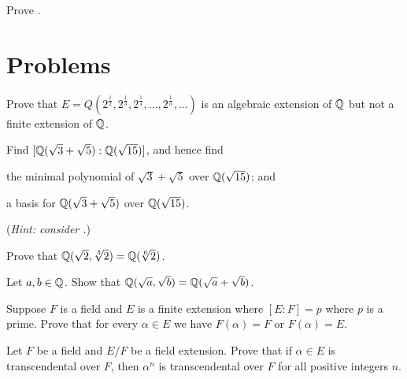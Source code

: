 \begin{exercise}\label{exercise-algebraically-closed-field-has-no-proper-algebraic-extension}
    Prove .
\end{exercise}

\newpage

\section{Problems}
\begin{problem}
    Prove that $E = Q(2^{\frac12}, 2^{\frac13}, 2^{\frac14}, \dots, 2^{\frac1n}, \dots)$ is an algebraic extension of $\mathbb{Q}$ but not a finite extension of $\mathbb{Q}$.
\end{problem}

\begin{problem}
    Find $[\mathbb{Q}(\sqrt3+\sqrt5):\mathbb{Q}(\sqrt{15})]$, and hence find
    \begin{partquestions}{\alph*}
        \item the minimal polynomial of $\sqrt3 + \sqrt5$ over $\mathbb{Q}(\sqrt{15})$; and
        \item a basis for $\mathbb{Q}(\sqrt3+\sqrt5)$ over $\mathbb{Q}(\sqrt{15})$.
    \end{partquestions}
    (\textit{Hint: consider .})
\end{problem}

\begin{problem}
    Prove that $\mathbb{Q}(\sqrt2,\sqrt[3]2) = \mathbb{Q}(\sqrt[6]2)$.
\end{problem}

\begin{problem}
    Let $a, b \in \mathbb{Q}$. Show that $\mathbb{Q}(\sqrt a, \sqrt b) = \mathbb{Q}(\sqrt a + \sqrt b)$.
\end{problem}

\begin{problem}
    Suppose $F$ is a field and $E$ is a finite extension where $[E:F] = p$ where $p$ is a prime. Prove that for every $\alpha \in E$ we have $F(\alpha) = F$ or $F(\alpha) = E$.
\end{problem}

\begin{problem}
    Let $F$ be a field and $E/F$ be a field extension. Prove that if $\alpha \in E$ is transcendental over $F$, then $\alpha^n$ is transcendental over $F$ for all positive integers $n$.
\end{problem}

